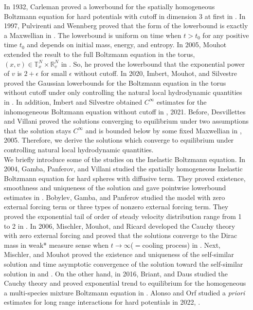 \documentclass[reqno,10pt]{amsart}
\numberwithin{equation}{section}
\begin{document}
In 1932, Carleman  proved a lowerbound for the spatially homogeneous Boltzmann equation for hard potentials with cutoff in dimension 3 at first in \cite{CT1932}. In 1997, Pulvirenti and Wennberg proved that the form of the lowerbound is exactly a Maxwellian in \cite{AB1996}. The lowerbound is uniform on time when $t>t_0$ for any positive time $t_0$ and depends on initial mass, energy, and entropy. In 2005, Mouhot extended the result to the full Boltzmann equation in the torus, $(x,v) \in \mathbb{T}_{x}^{N}\times \mathbb{R}_{v}^{N}$ in \cite{M2005}. So, he proved the lowerbound that the exponential power of $v$ is $2+\epsilon$ for small $\epsilon$ without cutoff. In 2020, Imbert, Mouhot, and Silvestre proved the Gaussian lowerbounds for the Boltzmann equation in the torus without cutoff under only controlling the natural local hydrodynamic quantities in  \cite{IM2020}. In addition, Imbert and Silvestre obtained $C^{\infty}$ estimates for the inhomogeneous Boltzmann equation without cutoff in \cite{IS2021}, 2021. Before, Desvillettes and Villani proved the solutions converging to equilibrium under two assumptions that the solution stays $C^{\infty}$ and is bounded below by some fixed Maxwellian in \cite{LC2005}, 2005. Therefore, we derive the solutions which converge to equilibrium under controlling natural local hydrodynamic quantities.  \\

We briefly introduce some of the studies on the Inelastic Boltzmann equation. In 2004, Gamba, Panferov, and Villani studied the spatially homogeneous Inelastic Boltzmann equation for hard spheres with diffusive term. They proved existence, smoothness and uniqueness of the solution and gave pointwise lowerbound estimates in \cite{IV2004}. Bobylev, Gamba, and Panferov studied the model with zero external forcing term or three types of nonzero external forcing term. They proved the exponential tail of order of steady velocity distribution range from 1 to 2 in \cite{AIV2004}. In 2006, Mischler, Mouhot, and Ricard developed the Cauchy theory with zero external forcing and proved that the solutions converge to the Dirac mass in weak* measure sense when $t \rightarrow \infty$($=$cooling process) in \cite{MMR2006}. Next, Mischler, and Mouhot proved the existence and uniqueness of the self-similar solution and time asymptotic convergence of the solution toward the self-similar solution in \cite{SC2006} and \cite{SC2009}. On the other hand, in 2016, Briant, and Daus studied the Cauchy theory and proved exponential trend to equilibrium for the homogeneous a multi-species mixture Boltzmann equation in \cite{ME2016}. Alonso and Orf studied a \textit{priori} estimates for long range interactions for hard potentials in 2022, \cite{AO2022}. \\
\end{document}

